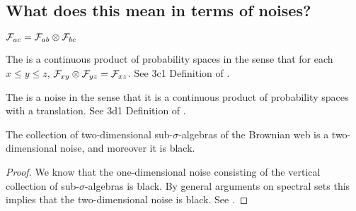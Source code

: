 {\subsection{What does this mean in terms of noises?}

\begin{theorem}
  $\mathcal{F}_{a c} = \mathcal{F}_{a b} \otimes \mathcal{F}_{b c}$
\end{theorem}

\begin{theorem}
  The \brownianwebnoise{}
  is a continuous product of probability spaces in the sense that
  for each $x \le y \le z$, $\mathcal{F}_{x y} \otimes \mathcal{F}_{y z} =
  \mathcal{F}_{x z}$.
  See 3c1 Definition of
  \cite{tsirelson-nonclassical-stochastic-flows}.
\end{theorem}

\begin{theorem}
  The \brownianwebnoise{} is a noise in the sense that it is a
  continuous product of probability spaces with a translation.
  See 3d1 Definition of
  \cite{tsirelson-nonclassical-stochastic-flows}.
\end{theorem}


\begin{theorem}
  The collection of two-dimensional sub-$\sigma$-algebras of the
  Brownian web is a two-dimensional noise, and moreover it is black.
\end{theorem}

\begin{proof}
  We know that the one-dimensional noise consisting of the vertical
  collection of sub-$\sigma$-algebras is black.  By general arguments
  on spectral sets this implies that the two-dimensional noise is
  black.  See \cite{tsirelson-classicality-blackness-spectrum}.
\end{proof}

}

